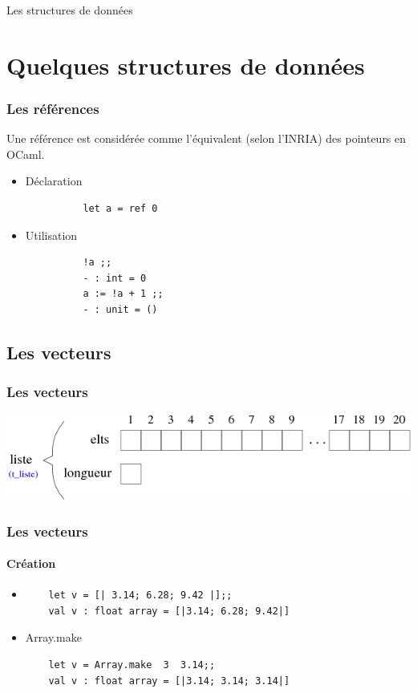 \begin{frame}
	\begin{center}
		\huge
		Les structures de données
	\end{center}
\end{frame}


\section{Quelques structures de données}
\begin{frame}[fragile]
	\frametitle{Les références}
	Une référence est considérée comme l'équivalent (selon l'INRIA) des pointeurs en OCaml.\\
	\begin{itemize}
	\item Déclaration
		\begin{lstlisting}
		  let a = ref 0
		\end{lstlisting}
	\item Utilisation
		\begin{lstlisting}
		  !a ;;
		  - : int = 0
		  a := !a + 1 ;;
		  - : unit = ()
		\end{lstlisting}
	\end{itemize}

\end{frame}

\subsection{Les vecteurs}

\begin{frame}
	\frametitle{Les vecteurs}
	\includegraphics[scale=0.5]{pics/vect.png}
\end{frame}

\begin{frame}[fragile]
	\frametitle{Les vecteurs}
	\framesubtitle{Création}
	\begin{itemize}
	\item
	\begin{lstlisting}
	let v = [| 3.14; 6.28; 9.42 |];;
	val v : float array = [|3.14; 6.28; 9.42|]
	\end{lstlisting}

	\item Array.make
	\begin{lstlisting}
	let v = Array.make  3  3.14;;
	val v : float array = [|3.14; 3.14; 3.14|]
	\end{lstlisting}

	\end{itemize}
\end{frame}


